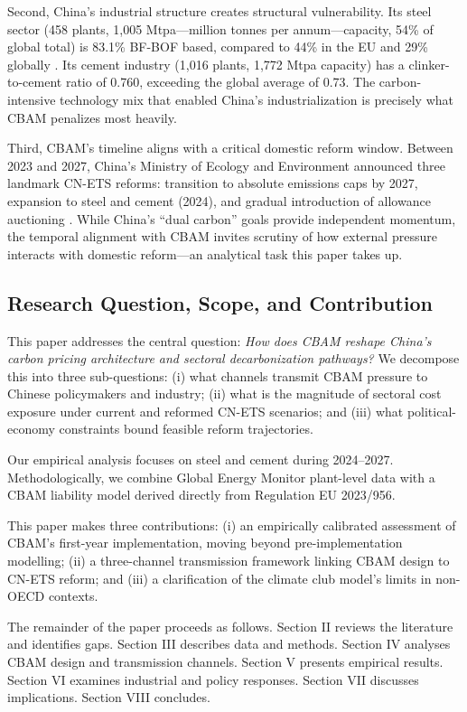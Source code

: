 \documentclass[letterpaper, 10pt, conference]{ieeeconf}
\begin{document}
Second, China's industrial structure creates structural vulnerability. Its steel sector (458 plants, 1{,}005 Mtpa---million tonnes per annum---capacity, 54\% of global total) is 83.1\% BF-BOF based, compared to 44\% in the EU and 29\% globally \citep{WorldSteel2024}. Its cement industry (1{,}016 plants, 1{,}772 Mtpa capacity) has a clinker-to-cement ratio of 0.760, exceeding the global average of 0.73. The carbon-intensive technology mix that enabled China's industrialization is precisely what CBAM penalizes most heavily.

Third, CBAM's timeline aligns with a critical domestic reform window. Between 2023 and 2027, China's Ministry of Ecology and Environment announced three landmark CN-ETS reforms: transition to absolute emissions caps by 2027, expansion to steel and cement (2024), and gradual introduction of allowance auctioning \citep{MEE2021,MEE2023}. While China's ``dual carbon'' goals provide independent momentum, the temporal alignment with CBAM invites scrutiny of how external pressure interacts with domestic reform---an analytical task this paper takes up.

\subsection{Research Question, Scope, and Contribution}

This paper addresses the central question: \textit{How does CBAM reshape China's carbon pricing architecture and sectoral decarbonization pathways?} We decompose this into three sub-questions: (i) what channels transmit CBAM pressure to Chinese policymakers and industry; (ii) what is the magnitude of sectoral cost exposure under current and reformed CN-ETS scenarios; and (iii) what political-economy constraints bound feasible reform trajectories.

Our empirical analysis focuses on steel and cement during 2024--2027. Methodologically, we combine Global Energy Monitor plant-level data with a CBAM liability model derived directly from Regulation EU 2023/956.

This paper makes three contributions: (i) an empirically calibrated assessment of CBAM's first-year implementation, moving beyond pre-implementation modelling; (ii) a three-channel transmission framework linking CBAM design to CN-ETS reform; and (iii) a clarification of the climate club model's limits in non-OECD contexts.

The remainder of the paper proceeds as follows. Section II reviews the literature and identifies gaps. Section III describes data and methods. Section IV analyses CBAM design and transmission channels. Section V presents empirical results. Section VI examines industrial and policy responses. Section VII discusses implications. Section VIII concludes.
\end{document}
